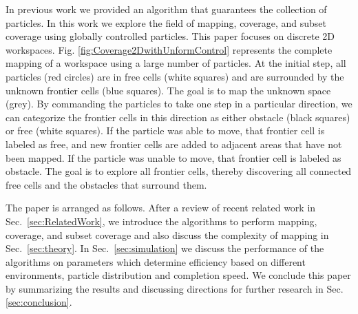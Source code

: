 In previous work \cite{mahadev2016collecting} we provided an algorithm that guarantees the collection of particles.
 In this work we explore the field of mapping, coverage, and subset coverage using globally controlled particles. 
 This paper focuses on discrete 2D workspaces.
Fig. \ref{fig:Coverage2DwithUnformControl} represents the complete mapping of a workspace using a large number of particles.  
At the initial step, all  particles (red circles) are in free cells (white squares) and are surrounded by the unknown frontier cells (blue squares). The goal is to map the unknown space (grey).
By commanding the particles to take one step in a particular direction, we can categorize the frontier cells in this direction as either obstacle (black squares) or free (white squares).
 If the particle was able to move, that frontier cell is labeled as free, and new frontier cells are added to adjacent areas that have not been mapped.
 If the particle was unable to move, that frontier cell is labeled as obstacle.
The goal is to explore all  frontier cells, thereby discovering all connected free cells and the obstacles that surround them. 

The paper is arranged as follows. 
After a review of recent related work in Sec.~\ref{sec:RelatedWork}, we introduce the algorithms to perform mapping, coverage, and subset coverage and also discuss the complexity of mapping in Sec.~\ref{sec:theory}.
 In Sec.~\ref{sec:simulation} we discuss the performance of the algorithms on parameters which determine efficiency based on different environments, particle distribution and completion speed. We conclude this paper by summarizing the results and discussing
 directions for further research in Sec.  \ref{sec:conclusion}.